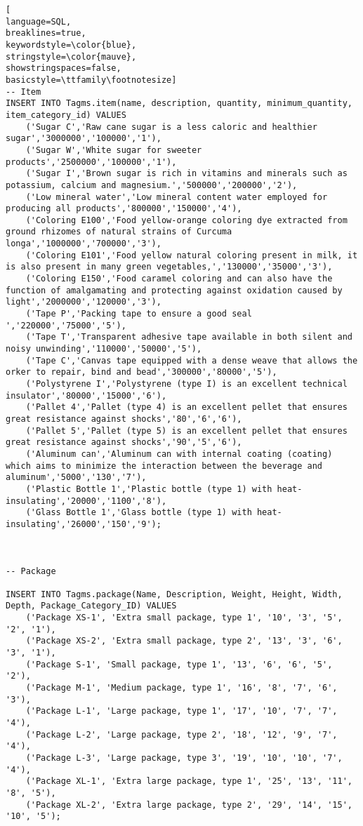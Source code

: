 \begin{lstlisting}[
language=SQL,
breaklines=true,
keywordstyle=\color{blue},
stringstyle=\color{mauve},
showstringspaces=false,
basicstyle=\ttfamily\footnotesize]
-- Item
INSERT INTO Tagms.item(name, description, quantity, minimum_quantity, item_category_id) VALUES
    ('Sugar C','Raw cane sugar is a less caloric and healthier sugar','3000000','100000','1'),
    ('Sugar W','White sugar for sweeter products','2500000','100000','1'),
    ('Sugar I','Brown sugar is rich in vitamins and minerals such as potassium, calcium and magnesium.','500000','200000','2'),
    ('Low mineral water','Low mineral content water employed for producing all products','800000','150000','4'),
    ('Coloring E100','Food yellow-orange coloring dye extracted from ground rhizomes of natural strains of Curcuma longa','1000000','700000','3'),
    ('Coloring E101','Food yellow natural coloring present in milk, it is also present in many green vegetables,','130000','35000','3'),
    ('Coloring E150','Food caramel coloring and can also have the function of amalgamating and protecting against oxidation caused by light','2000000','120000','3'),
    ('Tape P','Packing tape to ensure a good seal ','220000','75000','5'),
    ('Tape T','Transparent adhesive tape available in both silent and noisy unwinding','110000','50000','5'),
    ('Tape C','Canvas tape equipped with a dense weave that allows the orker to repair, bind and bead','300000','80000','5'),
    ('Polystyrene I','Polystyrene (type I) is an excellent technical insulator','80000','15000','6'),
    ('Pallet 4','Pallet (type 4) is an excellent pellet that ensures great resistance against shocks','80','6','6'),
    ('Pallet 5','Pallet (type 5) is an excellent pellet that ensures great resistance against shocks','90','5','6'),
    ('Aluminum can','Aluminum can with internal coating (coating) which aims to minimize the interaction between the beverage and aluminum','5000','130','7'),
    ('Plastic Bottle 1','Plastic bottle (type 1) with heat-insulating','20000','1100','8'),
    ('Glass Bottle 1','Glass bottle (type 1) with heat-insulating','26000','150','9');



-- Package

INSERT INTO Tagms.package(Name, Description, Weight, Height, Width, Depth, Package_Category_ID) VALUES
    ('Package XS-1', 'Extra small package, type 1', '10', '3', '5', '2', '1'),
    ('Package XS-2', 'Extra small package, type 2', '13', '3', '6', '3', '1'),
    ('Package S-1', 'Small package, type 1', '13', '6', '6', '5', '2'),
    ('Package M-1', 'Medium package, type 1', '16', '8', '7', '6', '3'),
    ('Package L-1', 'Large package, type 1', '17', '10', '7', '7', '4'),
    ('Package L-2', 'Large package, type 2', '18', '12', '9', '7', '4'),
    ('Package L-3', 'Large package, type 3', '19', '10', '10', '7', '4'),
    ('Package XL-1', 'Extra large package, type 1', '25', '13', '11', '8', '5'),
    ('Package XL-2', 'Extra large package, type 2', '29', '14', '15', '10', '5');



\end{lstlisting}

